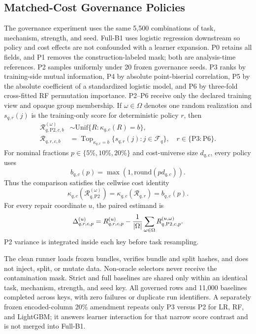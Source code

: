 \documentclass[sigconf,review]{acmart}
\begin{document}
\subsection{Matched-Cost Governance Policies}

The governance experiment uses the same 5,500 combinations of task, mechanism,
strength, and seed. Full-B1 uses logistic regression downstream so policy and
cost effects are not confounded with a learner expansion. P0 retains all
fields, and P1 removes the construction-labeled mask; both are analysis-time
references. P2 samples uniformly under 20 frozen governance seeds. P3 ranks by
training-side mutual information, P4 by absolute point-biserial correlation,
P5 by the absolute coefficient of a standardized logistic model, and P6 by
three-fold cross-fitted RF permutation importance. P2--P6 receive only the
declared training view and opaque group membership. If $\omega\in\Omega$
denotes one random realization and $s_{q,r}(j)$ is the training-only score for
deterministic policy $r$, then
\begin{align}
 \mathcal{R}_{q,\mathrm{P2},c,b}^{(\omega)}
 &\sim \mathrm{Unif}\{R:\kappa_{q,c}(R)=b\},
 \label{eq:p2}\\
 \mathcal{R}_{q,r,c,b}
 &=\operatorname{Top}_{\kappa_{q,c}=b}
 \{s_{q,r}(j):j\in\mathcal{F}_q\},\quad r\in\{\mathrm{P3{:}P6}\}.
 \label{eq:learned-policy}
\end{align}
For nominal fractions $p\in\{5\%,10\%,20\%\}$ and cost-universe size
$d_{q,c}$, every policy uses
\begin{equation}
  b_{q,c}(p)=\max\!\left(1,\mathrm{round}(p d_{q,c})\right).
 \label{eq:budget}
\end{equation}
Thus the comparison satisfies the cellwise cost identity
\begin{equation}
 \kappa_{q,c}(\mathcal{R}_{q,\mathrm{P2}}^{(\omega)})
 =\kappa_{q,c}(\mathcal{R}_{q,r})=b_{q,c}(p).
 \label{eq:matched-cost}
\end{equation}
For every repair coordinate $u$, the paired estimand is
\begin{equation}
 \Delta^{(u)}_{q,r,c,p}=R^{(u)}_{q,r,c,p}
 -{1\over|\Omega|}\sum_{\omega\in\Omega}
 R^{(u,\omega)}_{q,\mathrm{P2},c,p}.
 \label{eq:full-b1-estimand}
\end{equation}
P2 variance is integrated inside each key before task resampling.

The clean runner loads frozen bundles, verifies bundle and split hashes, and
does not inject, split, or mutate data. Non-oracle selectors never receive the
contamination mask. Strict and full baselines are shared only within an
identical task, mechanism, strength, and seed key. All
\FullBOneGovernedCount{} governed rows and 11,000 baselines completed across
\GovernanceKeyCount{} keys, with zero failures or duplicate run identifiers.
A separately frozen encoded-column 20\% amendment repeats only P3 versus P2
for LR, RF, and LightGBM; it answers learner interaction for that narrow score
contrast and is not merged into Full-B1.
\end{document}
